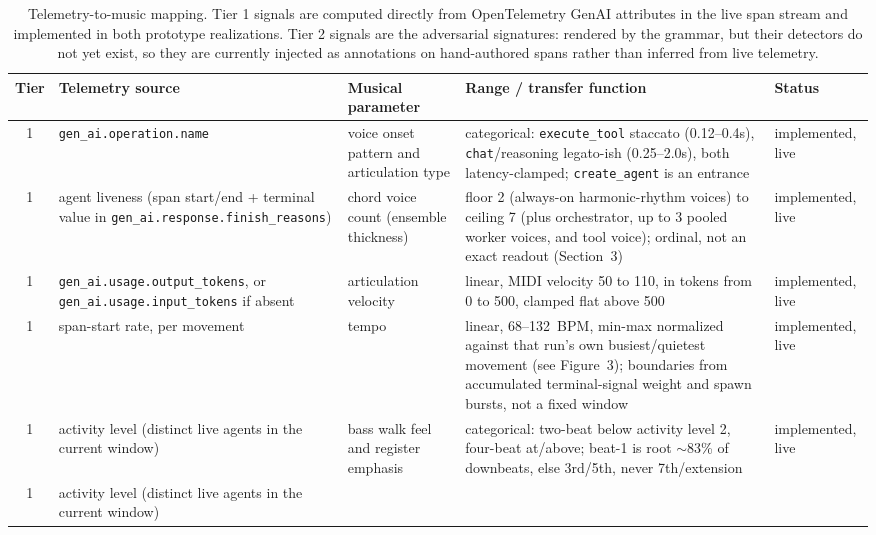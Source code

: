 \begin{table}[t]
\centering
\caption{Telemetry-to-music mapping. Tier 1 signals are computed directly from OpenTelemetry
GenAI attributes in the live span stream and implemented in both prototype realizations. Tier 2
signals are the adversarial signatures: rendered by the grammar, but their detectors do not yet
exist, so they are currently injected as annotations on hand-authored spans rather than inferred
from live telemetry.}
\label{tab:mapping}
\begin{tabular}{@{}cllll@{}}
\toprule
Tier & Telemetry source & Musical parameter & Range / transfer function & Status \\
\midrule
1 & \texttt{gen\_ai.operation.name} & voice onset pattern and articulation type &
  categorical: \texttt{execute\_tool} staccato (0.12--0.4s), \texttt{chat}/reasoning legato-ish
  (0.25--2.0s), both latency-clamped; \texttt{create\_agent} is an entrance & implemented, live \\
1 & agent liveness (span start/end + terminal value in \texttt{gen\_ai.response.finish\_reasons}) &
  chord voice count (ensemble thickness) &
  floor 2 (always-on harmonic-rhythm voices) to ceiling 7 (plus orchestrator, up to 3 pooled
  worker voices, and tool voice); ordinal, not an exact readout (Section~3) & implemented, live \\
1 & \texttt{gen\_ai.usage.output\_tokens}, or \texttt{gen\_ai.usage.input\_tokens} if absent &
  articulation velocity &
  linear, MIDI velocity 50 to 110, in tokens from 0 to 500, clamped flat above 500 &
  implemented, live \\
1 & span-start rate, per movement & tempo &
  linear, 68--132~BPM, min-max normalized against that run's own busiest/quietest movement
  (see Figure~3); boundaries from accumulated terminal-signal weight and spawn bursts, not a
  fixed window & implemented, live \\
1 & activity level (distinct live agents in the current window) &
  bass walk feel and register emphasis &
  categorical: two-beat below activity level 2, four-beat at/above; beat-1 is root
  $\sim$83\% of downbeats, else 3rd/5th, never 7th/extension & implemented, live \\
1 & activity level (distinct live agents in the current window) &

\end{tabular}
\end{table}
